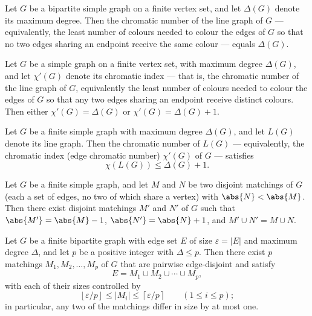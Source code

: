\begin{theorem}
\label{SimpleGraph.edgeChromaticNumber_eq_maxDegree_of_isBipartite}
Let $G$ be a bipartite simple graph on a finite vertex set, and let $\Delta(G)$ denote
its maximum degree. Then the chromatic number of the line graph of $G$ — equivalently,
the least number of colours needed to colour the edges of $G$ so that no two edges
sharing an endpoint receive the same colour — equals $\Delta(G)$.
\end{theorem}

\begin{theorem}
\label{SimpleGraph.vizing_chromatic_index}
Let $G$ be a simple graph on a finite vertex set, with maximum degree $\Delta(G)$, and
let $\chi'(G)$ denote its chromatic index — that is, the chromatic number of the line
graph of $G$, equivalently the least number of colours needed to colour the edges of $G$
so that any two edges sharing an endpoint receive distinct colours. Then either
$\chi'(G) = \Delta(G)$ or $\chi'(G) = \Delta(G) + 1$.
\end{theorem}

\begin{theorem}
\label{SimpleGraph.vizing_chromatic_index_le}
Let $G$ be a finite simple graph with maximum degree $\Delta(G)$, and let $L(G)$ denote
its line graph. Then the chromatic number of $L(G)$ — equivalently, the chromatic index
(edge chromatic number) $\chi'(G)$ of $G$ — satisfies
\[
\chi(L(G)) \le \Delta(G) + 1.
\]
\end{theorem}

\begin{theorem}
\label{SimpleGraph.exists_rebalanced_matchings}
Let $G$ be a finite simple graph, and let $M$ and $N$ be two disjoint matchings of $G$
(each a set of edges, no two of which share a vertex) with $\abs{N} < \abs{M}$. Then
there exist disjoint matchings $M'$ and $N'$ of $G$ such that $\abs{M'} = \abs{M} - 1$,
$\abs{N'} = \abs{N} + 1$, and $M' \cup N' = M \cup N$.
\end{theorem}

\begin{theorem}
\label{SimpleGraph.exists_balanced_matching_decomposition}
Let $G$ be a finite bipartite graph with edge set $E$ of size $\varepsilon = |E|$ and
maximum degree $\Delta$, and let $p$ be a positive integer with $\Delta \le p$. Then
there exist $p$ matchings $M_1, M_2, \ldots, M_p$ of $G$ that are pairwise edge-disjoint
and satisfy
\[ E = M_1 \cup M_2 \cup \cdots \cup M_p, \]
with each of their sizes controlled by
\[ \left\lfloor \varepsilon/p \right\rfloor \le |M_i| \le \left\lceil \varepsilon/p \right\rceil \qquad (1 \le i \le p); \]
in particular, any two of the matchings differ in size by at most one.
\end{theorem}

